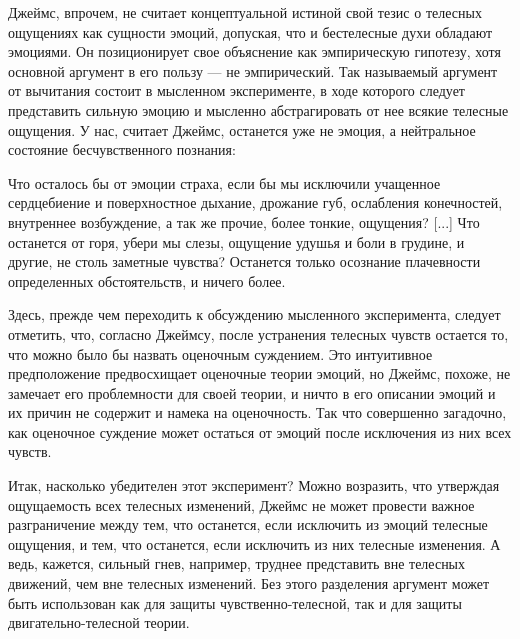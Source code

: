 \documentclass[11pt]{book}
\begin{document}
Джеймс, впрочем, не считает концептуальной истиной свой тезис о телесных ощущениях как сущности эмоций, допуская, что и бестелесные духи обладают эмоциями. Он позиционирует свое объяснение как эмпирическую гипотезу, хотя основной аргумент в его пользу --- не эмпирический. Так называемый аргумент от вычитания состоит в мысленном эксперименте, в ходе которого следует представить сильную эмоцию и мысленно абстрагировать от нее всякие телесные ощущения. У нас, считает Джеймс, останется уже не эмоция, а нейтральное состояние бесчувственного познания:

\smallskip

\quad Что осталось бы от эмоции страха, если бы мы исключили учащенное сердцебиение и поверхностное дыхание, дрожание губ, ослабления конечностей, внутреннее возбуждение, а так же прочие, более тонкие, ощущения? [...] Что останется от горя, убери мы слезы, ощущение удушья и боли в грудине, и другие, не столь заметные чувства? Останется только осознание плачевности определенных обстоятельств, и ничего более.

\smallskip

Здесь, прежде чем переходить к обсуждению мысленного эксперимента, следует отметить, что, согласно Джеймсу, после устранения телесных чувств остается то, что можно было бы назвать оценочным суждением. Это интуитивное предположение предвосхищает оценочные теории эмоций, но Джеймс, похоже, не замечает его проблемности для своей теории, и ничто в его описании эмоций и их причин не содержит и намека на оценочность. Так что совершенно загадочно, как оценочное суждение может остаться от эмоций после исключения из них всех чувств.

Итак, насколько убедителен этот эксперимент? Можно возразить, что утверждая ощущаемость всех телесных изменений, Джеймс не может провести важное разграничение между тем, что останется, если исключить из эмоций телесные ощущения, и тем, что останется, если исключить из них телесные изменения. А ведь, кажется, сильный гнев, например, труднее представить вне телесных движений, чем вне телесных изменений. Без этого разделения аргумент может быть использован как для защиты чувственно-телесной, так и для защиты двигательно-телесной теории.
\end{document}
